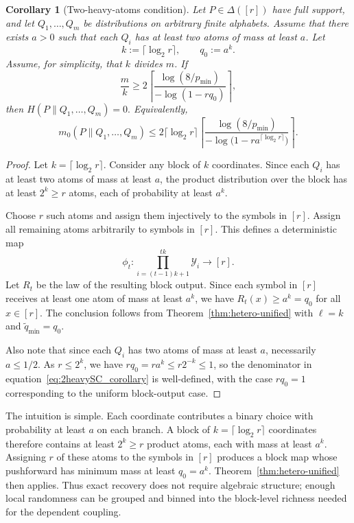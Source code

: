 \documentclass[journal]{IEEEtran}
\newtheorem{corollary}{Corollary}
\def\calY{{\mathcal Y}}
\newcommand{\1}{\mathbf{1}}
\begin{document}
\begin{corollary}[Two-heavy-atoms condition]\label{cor:two-heavy-atoms}
Let $P\in\Delta([r])$ have full support, and let $Q_1,\dots,Q_m$ be distributions on arbitrary finite alphabets. Assume that there exists $a>0$ such that each $Q_i$ has at least two atoms of mass at least $a$. Let
$$
k:=\lceil\log_2 r\rceil,
\qquad
q_0:=a^k.
$$
Assume, for simplicity, that $k$ divides $m$. If
$$
\frac{m}{k}
\ge
2\left\lceil
\frac{\log(8/p_{\min})}{-\log(1-rq_0)}
\right\rceil,
$$
then
$H(P\|Q_1,\dots,Q_m)=0.$
Equivalently,
\begin{equation}\label{eq:2heavySC_corollary}
m_0(P\|Q_1,\dots,Q_m)
\le
2\lceil\log_2 r\rceil
\left\lceil
\frac{\log(8/p_{\min})}
{-\log\!\bigl(1-r a^{\lceil\log_2 r\rceil}\bigr)}
\right\rceil.
\end{equation}
\end{corollary}
\begin{proof}
Let $k=\lceil\log_2 r\rceil$. Consider any block of $k$ coordinates. Since each $Q_i$ has at least two atoms of mass at least $a$, the product distribution over the block has at least $2^k\ge r$ atoms, each of probability at least $a^k$.

Choose $r$ such atoms and assign them injectively to the symbols in $[r]$. Assign all remaining atoms arbitrarily to symbols in $[r]$. This defines a deterministic map
$$
\phi_t:\prod_{i=(t-1)k+1}^{tk}\calY_i\to[r].
$$
Let $R_t$ be the law of the resulting block output. Since each symbol in $[r]$ receives at least one atom of mass at least $a^k$, we have $R_t(x)\ge a^k=q_0$ for all $x\in[r]$. The conclusion follows from Theorem~\ref{thm:hetero-unified} with $\ell=k$ and $\widetilde q_{\min}=q_0$.

Also note that since each $Q_i$ has two atoms of mass at least $a$, necessarily $a\le 1/2$.
As $r\le 2^k$, we have $rq_0=ra^k\le r2^{-k}\le 1$, so the denominator in equation~\eqref{eq:2heavySC_corollary} is well-defined, with the case $rq_0=1$ corresponding to the uniform block-output case.
\end{proof}

The intuition is simple. Each coordinate contributes a binary choice with
probability at least $a$ on each branch. A block of
$k=\lceil\log_2 r\rceil$ coordinates therefore contains at least $2^k\ge r$
product atoms, each with mass at least $a^k$. Assigning $r$ of these atoms to
the symbols in $[r]$ produces a block map whose pushforward has minimum mass at
least $q_0=a^k$. Theorem~\ref{thm:hetero-unified} then applies. Thus exact
recovery does not require algebraic structure; enough local randomness can be
grouped and binned into the block-level richness needed for the dependent
coupling.
\end{document}
